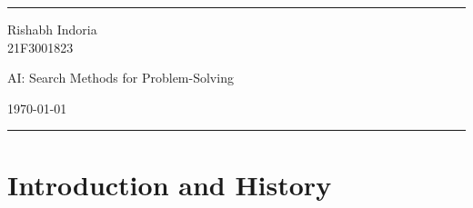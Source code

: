 \documentclass[a4paper]{article}
\begin{document}
\fancyhead[c]{}
\hrule \medskip
\begin{minipage}{0.195\textwidth}
\raggedright
Rishabh Indoria\\
21F3001823
\end{minipage}
\begin{minipage}{0.6\textwidth}
\centering
\LARGE
AI: Search Methods for Problem-Solving
\end{minipage}
\begin{minipage}{0.195\textwidth}
\raggedleft
\today \hfill \\
\end{minipage}
\medskip \hrule
\bigskip

\section{Introduction and History}
\end{document}
